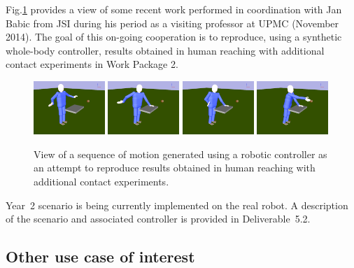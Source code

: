 \documentclass[12pt,a4paper,twoside]{article}
\begin{document}
Fig.\ref{fig:babic_lober_snapshots} provides a view of some recent work performed in coordination with Jan Babic from JSI during his period as a visiting professor at UPMC (November 2014). The goal of this on-going cooperation is to reproduce, using a synthetic whole-body controller, results obtained in human reaching with additional contact experiments in Work Package 2.\\

    \begin{figure}[h!]
      \centering
      \includegraphics[width=0.24\textwidth]{figure/lober_babic_seq1}
	\includegraphics[width=0.24\textwidth]{figure/lober_babic_seq2}
	\includegraphics[width=0.24\textwidth]{figure/lober_babic_seq3}
	\includegraphics[width=0.24\textwidth]{figure/lober_babic_seq4}
      \caption{View of a sequence of motion generated using a robotic controller as an attempt to reproduce results obtained in human reaching with additional contact experiments.}
      \label{fig:babic_lober_snapshots}
   \end{figure}


Year~2 scenario is being currently implemented on the real robot. A description of the scenario and associated controller is provided in Deliverable~5.2.

\subsection{Other use case of interest}
\end{document}

